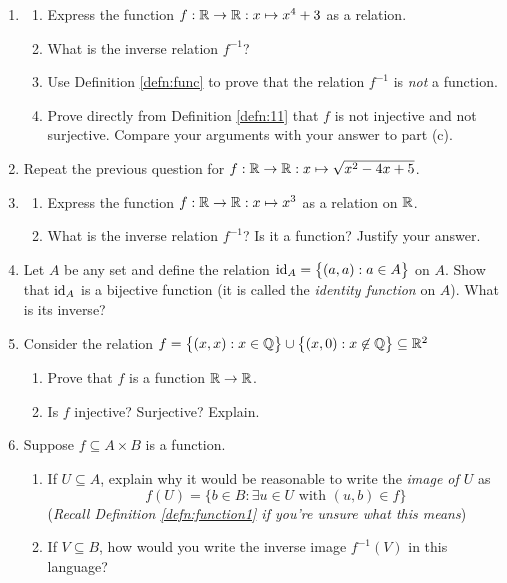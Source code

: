\begin{exercises}{}{}
\begin{enumerate}
  
  \item\begin{enumerate}
    \item Express the function $f:\mathbb{R}\to\mathbb{R}:x\mapsto x^4+3$ as a relation.
    \item What is the inverse relation $f^{-1}$?
    \item Use Definition \ref{defn:func} to prove that the relation $f^{-1}$ is \emph{not} a function.
    \item Prove directly from Definition \ref{defn:11} that $f$ is not injective and not surjective. Compare your arguments with your answer to part (c).
  \end{enumerate}
  
  
  \item Repeat the previous question for $f:\mathbb{R}\to\mathbb{R}:x\mapsto \sqrt{x^2-4x+5}$.
  
  
  \item\begin{enumerate}
    \item Express the function $f:\mathbb{R}\to\mathbb{R}:x\mapsto x^3$ as a relation on $\mathbb{R}$.
    \item What is the inverse relation $f^{-1}$? Is it a function? Justify your answer.
  \end{enumerate} 
  
  
  \item	Let $A$ be any set and define the relation $\operatorname{id}_A=\bigl\{(a,a):a\in A\bigr\}$ on $A$. Show that $\operatorname{id}_A$ is a bijective function (it is called the \emph{identity function} on $A$). What is its inverse?

  
  \item Consider the relation $f=\bigl\{(x,x):x\in\mathbb{Q}\bigr\}\cup\bigl\{(x,0):x\not\in\mathbb{Q}\bigr\} \subseteq \mathbb{R}^2$
  \begin{enumerate}
    \item Prove that $f$ is a function $\mathbb{R}\to\mathbb{R}$.
    \item Is $f$ injective? Surjective? Explain.
  \end{enumerate}
  
  
  
  
  \item Suppose $f\subseteq A\times B$ is a function.
  \begin{enumerate}
    \item If $U\subseteq A$, explain why it would be reasonable to write the \emph{image of $U$}  as
    \[
    	f(U)=\bigl\{ b\in B:\exists u\in U\text{ with }(u,b)\in f\bigr\}
    \]
    (\emph{Recall Definition \ref{defn:function1} if you're unsure what this means})
    \item If $V\subseteq B$, how would you write the inverse image $f^{-1}(V)$ in this language?
  \end{enumerate}
\end{enumerate}


\end{exercises}
